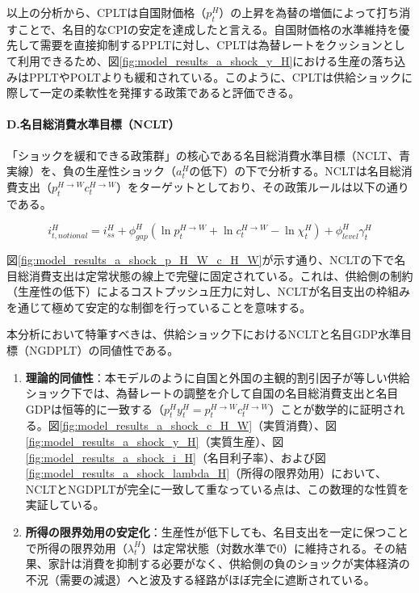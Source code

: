 以上の分析から、CPLTは自国財価格（\(p_t^H\)）の上昇を為替の増価によって打ち消すことで、名目的なCPIの安定を達成したと言える。自国財価格の水準維持を優先して需要を直接抑制するPPLTに対し、CPLTは為替レートをクッションとして利用できるため、図\ref{fig:model_results_a_shock_y_H}における生産の落ち込みはPPLTやPOLTよりも緩和されている。このように、CPLTは供給ショックに際して一定の柔軟性を発揮する政策であると評価できる。

\paragraph{D.名目総消費水準目標（NCLT）}\label{sec:model_results_a_shock_asad_analysis_nclt}
「ショックを緩和できる政策群」の核心である名目総消費水準目標（NCLT、青実線）を、負の生産性ショック（\(a_t^H\)の低下）の下で分析する。NCLTは名目総消費支出（\(p_t^{H\to W}c_t^{H\to W}\)）をターゲットとしており、その政策ルールは以下の通りである。

\begin{equation}
i_{t,notional}^H=i_{ss}^H+\phi_{gap}^H(\ln p_t^{H\to W}+\ln c_t^{H\to W}-\ln\chi_t^H)+\phi_{level}^H\gamma_t^H
\label{form:model_results_a_shock_nclt_policy}
\end{equation}

図\ref{fig:model_results_a_shock_p_H_W_c_H_W}が示す通り、NCLTの下で名目総消費支出は定常状態の線上で完璧に固定されている。これは、供給側の制約（生産性の低下）によるコストプッシュ圧力に対し、NCLTが名目支出の枠組みを通じて極めて安定的な制御を行っていることを意味する。

本分析において特筆すべきは、供給ショック下におけるNCLTと名目GDP水準目標（NGDPLT）の同値性である。

\begin{enumerate}
    \item\label{itm:model_results_a_shock_asad_analysis_nclt_equivalence} \textbf{理論的同値性}：本モデルのように自国と外国の主観的割引因子が等しい供給ショック下では、為替レートの調整を介して自国の名目総消費支出と名目GDPは恒等的に一致する（\(p_t^Hy_t^H=p_t^{H\to W}c_t^{H\to W}\)）ことが数学的に証明される。図\ref{fig:model_results_a_shock_c_H_W}（実質消費）、図\ref{fig:model_results_a_shock_y_H}（実質生産）、図\ref{fig:model_results_a_shock_i_H}（名目利子率）、および図\ref{fig:model_results_a_shock_lambda_H}（所得の限界効用）において、NCLTとNGDPLTが完全に一致して重なっている点は、この数理的な性質を実証している。
    \item\label{itm:model_results_a_shock_asad_analysis_nclt_lambda} \textbf{所得の限界効用の安定化}：生産性が低下しても、名目支出を一定に保つことで所得の限界効用（\(\lambda_t^H\)）は定常状態（対数水準で0）に維持される。その結果、家計は消費を抑制する必要がなく、供給側の負のショックが実体経済の不況（需要の減退）へと波及する経路がほぼ完全に遮断されている。
\end{enumerate}

